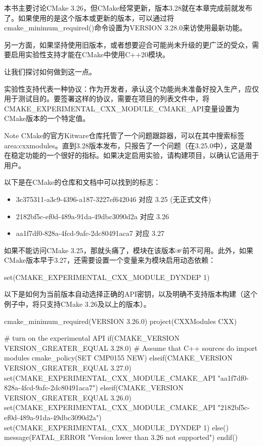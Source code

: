 
本书主要讨论CMake 3.26，但CMake经常更新，版本3.28就在本章完成前就发布了。如果使用的是这个版本或更新的版本，可以通过将cmake\_minimum\_required()命令设置为VERSION 3.28.0来访使用最新功能。

另一方面，如果坚持使用旧版本，或者想要迎合可能尚未升级的更广泛的受众，需要启用实验性支持才能在CMake中使用C++20模块。

让我们探讨如何做到这一点。


实验性支持代表一种协议：作为开发者，承认这个功能尚未准备好投入生产，应仅用于测试目的。要签署这样的协议，需要在项目的列表文件中，将CMAKE\_EXPERIMENTAL\_CXX\_MODULE\_CMAKE\_API变量设置为CMake版本的一个特定值。

\begin{myNotic}{Note}
CMake的官方Kitware仓库托管了一个问题跟踪器，可以在其中搜索标签area:cxxmodules。直到3.28版本发布，只报告了一个问题（在3.25.0中），这是潜在稳定功能的一个很好的指标。如果决定启用实验，请构建项目，以确认它适用于用户。
\end{myNotic}

以下是在CMake的仓库和文档中可以找到的标志：

\begin{itemize}
\item
3c375311-a3c9-4396-a187-3227ef642046 对应 3.25 (无正式文件)

\item
2182bf5c-ef0d-489a-91da-49dbc3090d2a 对应 3.26

\item
aa1f7df0-828a-4fcd-9afc-2dc80491aca7 对应 3.27
\end{itemize}

如果不能访问CMake 3.25，那就头痛了，模块在该版本☞前不可用。此外，如果CMake版本早于3.27，还需要设置一个变量来为模块启用动态依赖：

\begin{cmake}
set(CMAKE_EXPERIMENTAL_CXX_MODULE_DYNDEP 1)
\end{cmake}

以下是如何为当前版本自动选择正确的API密钥，以及明确不支持版本构建（这个例子中，将只支持CMake 3.26及以上的版本）。


\begin{cmake}
cmake_minimum_required(VERSION 3.26.0)
project(CXXModules CXX)

# turn on the experimental API
if(CMAKE_VERSION VERSION_GREATER_EQUAL 3.28.0)
    # Assume that C++ sources do import modules
    cmake_policy(SET CMP0155 NEW)
elseif(CMAKE_VERSION VERSION_GREATER_EQUAL 3.27.0)
    set(CMAKE_EXPERIMENTAL_CXX_MODULE_CMAKE_API
        "aa1f7df0-828a-4fcd-9afc-2dc80491aca7")
elseif(CMAKE_VERSION VERSION_GREATER_EQUAL 3.26.0)
    set(CMAKE_EXPERIMENTAL_CXX_MODULE_CMAKE_API
        "2182bf5c-ef0d-489a-91da-49dbc3090d2a")
    set(CMAKE_EXPERIMENTAL_CXX_MODULE_DYNDEP 1)
else()
    message(FATAL_ERROR "Version lower than 3.26 not supported")
endif()
\end{cmake}

